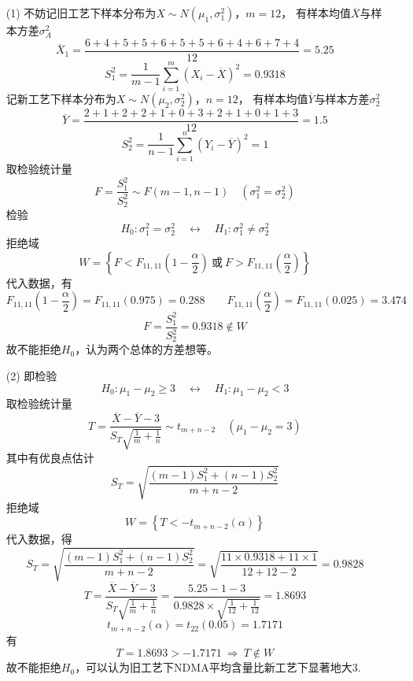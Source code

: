 \documentclass{article}
\begin{document}
\section{}  %
\begin{enumerate}
    \item [(1)]不妨记旧工艺下样本分布为$X\sim N(\mu_1, \sigma_1^2)$，$m=12$，
    有样本均值$\overline{X}$与样本方差$\sigma_A^2$
    \[
        \overline{X}_1
        = \frac{6 + 4 + 5 + 5 + 6 + 5 + 5 + 6 + 4 + 6 + 7 + 4}{12}    
        = 5.25
    \]
    \[
        S_1^2
        = \frac{1}{m-1} \sum\limits_{i=1}^{m} {(X_i - \overline{X})}^2
        = 0.9318
    \]
    记新工艺下样本分布为$X\sim N(\mu_2, \sigma_2^2)$，$n = 12$，
    有样本均值$\overline{Y}$与样本方差$\sigma_2^2$
    \[
        \overline{Y}
        = \frac{2 + 1 + 2 + 2 + 1 + 0 + 3 + 2 + 1 + 0 + 1 + 3}{12}
        = 1.5    
    \]
    \[
        S_2^2
        = \frac{1}{n-1} \sum\limits_{i=1}^{n} {(Y_i - \overline{Y})}^2
        = 1
    \]
    取检验统计量
    \[
        F = \frac{S_1^2}{S_2^2}  \sim F(m-1,n-1) \quad (\sigma_1^2 = \sigma_2^2)
    \]
    检验
    \[
        H_0 : \sigma_1^2 = \sigma_2^2 
        \quad \leftrightarrow \quad
        H_1 : \sigma_1^2 \neq \sigma_2^2 
    \]
    拒绝域
    \[
        W = 
        \left\{
            F < F_{11,11} \left(1 - \frac{\alpha}{2}\right)
            \ \mbox{或}\ 
            F > F_{11,11} \left(\frac{\alpha}{2}\right)
        \right\}
    \]
    代入数据，有
    \[
        F_{11,11} \left(1 - \frac{\alpha}{2}\right)
        = F_{11,11} (0.975)
        = 0.288
        \qquad
        F_{11,11} \left(\frac{\alpha}{2}\right)
        = F_{11,11} (0.025)
        = 3.474
    \]
    \[
        F 
        = \frac{S_1^2}{S_2^2}
        = 0.9318 \notin W 
    \]
    故不能拒绝$H_0$，认为两个总体的方差想等。
    \item [(2)]即检验
    \[
        H_0 : \mu_1 - \mu_2 \geq 3
        \quad \leftrightarrow \quad
        H_1 : \mu_1 - \mu_2 <3 
    \]
    取检验统计量
    \[
        T = \frac{\overline{X} - \overline{Y} - 3}
        {S_T \sqrt{\frac{1}{m} + \frac{1}{n}}}    
        \sim t_{m+n-2}
        \quad (\mu_1 - \mu_2 = 3)
    \]
    其中有优良点估计
    \[
        S_T = \sqrt{\frac{(m-1) S_1^2 + (n-1) S_2^2}{m+n-2}}    
    \]
    拒绝域
    \[
        W = 
        \left\{
            T < - t_{m+n-2} (\alpha)
        \right\}    
    \]
    代入数据，得
    \[
        S_T 
        = \sqrt{\frac{(m-1) S_1^2 + (n-1) S_2^2}{m+n-2}}  
        = \sqrt{\frac{11\times 0.9318 + 11\times 1}{12+12-2}}
        = 0.9828   
    \]
    \[
        T
        = \frac{\overline{X} - \overline{Y} - 3}{S_T \sqrt{\frac{1}{m} + \frac{1}{n}}}     
        = \frac{5.25 - 1 - 3}{0.9828 \times \sqrt{\frac{1}{12} + \frac{1}{12}}}
        = 1.8693
    \]
    \[
        t_{m+n-2}(\alpha) 
        = t_{22}(0.05)
        = 1.7171 
    \]
    有
    \[
        T = 1.8693 > -1.7171
        \ \Rightarrow\ 
        T \notin W    
    \]
    故不能拒绝$H_0$，可以认为旧工艺下NDMA平均含量比新工艺下显著地大3.
\end{enumerate}
\end{document}
